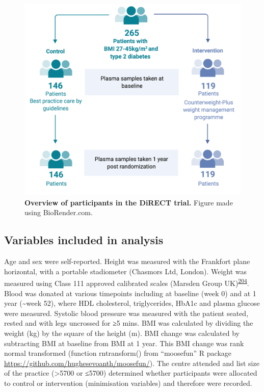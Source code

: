\documentclass[11pt,twoside]{bristolthesis}
\begin{document}
\begin{figure}

{\centering \includegraphics{figure/DiRECT/DiRECT_study_summary} 

}

\caption[Overview of participants in the DiRECT trial]{\textbf{Overview of participants in the DiRECT trial.} Figure made using BioRender.com.}\label{fig:direct-participants}
\end{figure}
\hypertarget{variables-included-in-analysis}{%
\subsection{Variables included in analysis}\label{variables-included-in-analysis}}

Age and sex were self-reported. Height was measured with the Frankfort plane horizontal, with a portable stadiometer (Chasmors Ltd, London). Weight was measured using Class 111 approved calibrated scales (Marsden Group UK)\textsuperscript{\protect\hyperlink{ref-Leslie2016}{204}}. Blood was donated at various timepoints including at baseline (week 0) and at 1 year (\textasciitilde week 52), where HDL cholesterol, triglycerides, HbA1c and plasma glucose were measured. Systolic blood pressure was measured with the patient seated, rested and with legs uncrossed for ≥5 mins. BMI was calculated by dividing the weight (kg) by the square of the height (m). BMI change was calculated by subtracting BMI at baseline from BMI at 1 year. This BMI change was rank normal transformed (function rntransform() from ``moosefun'' R package \url{https://github.com/hughesevoanth/moosefun/}). The centre attended and list size of the practice (\textgreater5700 or ≤5700) determined whether participants were allocated to control or intervention (minimisation variables) and therefore were recorded.
\end{document}

